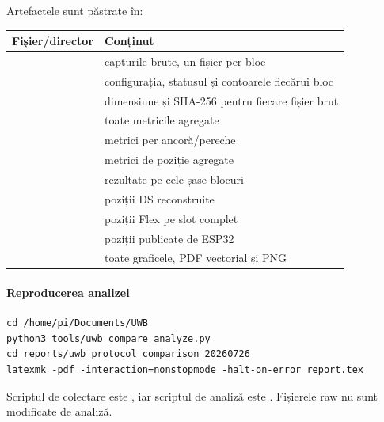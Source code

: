 \documentclass[11pt,a4paper]{article}
\begin{document}
Artefactele sunt păstrate în:
\begin{quote}
\end{quote}

\small
\noindent
\begin{tabularx}{\textwidth}{p{56mm}Y}
  \toprule
  Fișier/director & Conținut\\
  \midrule
   & capturile brute, un fișier per bloc\\
   & configurația, statusul și contoarele fiecărui
  bloc\\
   & dimensiune și SHA-256 pentru fiecare
  fișier brut\\
   & toate metricile agregate\\
   & metrici per ancoră/pereche\\
   & metrici de poziție agregate\\
   & rezultate pe cele șase blocuri\\
   & poziții DS reconstruite\\
   & poziții Flex pe slot complet\\
   & poziții publicate de ESP32\\
   & toate graficele, PDF vectorial și PNG\\
  \bottomrule
\end{tabularx}

\paragraph{Reproducerea analizei}
\begin{verbatim}
cd /home/pi/Documents/UWB
python3 tools/uwb_compare_analyze.py
cd reports/uwb_protocol_comparison_20260726
latexmk -pdf -interaction=nonstopmode -halt-on-error report.tex
\end{verbatim}

Scriptul de colectare este , iar scriptul de
analiză este . Fișierele raw nu sunt
modificate de analiză.
\end{document}
